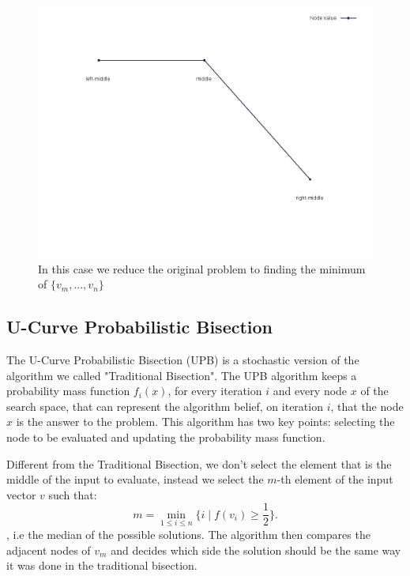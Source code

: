 \documentclass[12pt]{article}
\begin{document}
    \begin{figure}[H]
        \centering
        \includegraphics[scale=.35]{mid_case9}
        \caption{In this case we reduce the original problem to finding the minimum of $\{v_m, ..., v_n\}$}
    \end{figure}

\subsection{U-Curve Probabilistic Bisection}
The U-Curve Probabilistic Bisection (UPB) is a stochastic version of the algorithm we called "Traditional Bisection". The UPB algorithm keeps a probability mass function $f_i (x)$, for every iteration $i$ and every node $x$ of the search space, that can represent the algorithm belief, on iteration $i$, that the node $x$ is the answer to the problem. This algorithm has two key points: selecting the node to be evaluated and updating the probability mass function.

Different from the Traditional Bisection, we don't select the element that is the middle of the input to evaluate, instead we select the $m$-th element of the input vector $v$ such that:
\begin{equation*}
    m = \min\limits_{1 \leq i \leq n} \{i \mid f (v_i) \geq \frac{1}{2}\}.
\end{equation*}
, i.e the median of the possible solutions. The algorithm then compares the adjacent nodes of $v_m$ and decides which side the solution should be the same way it was done in the traditional bisection.
\end{document}
